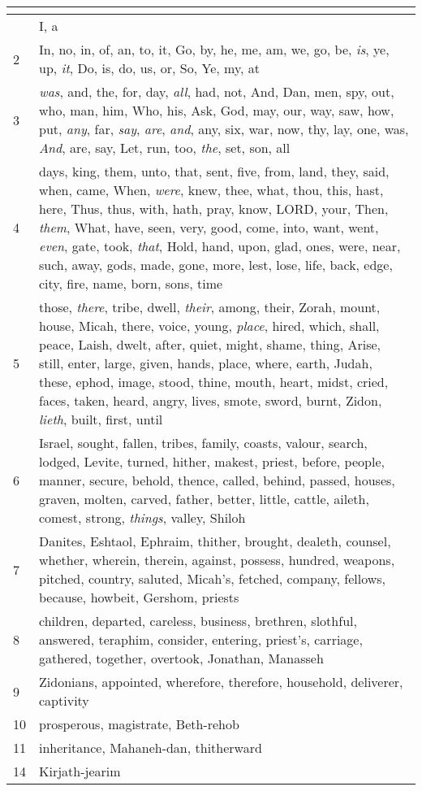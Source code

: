 \begin{center}
\begin{longtable}{l|p{3.75in}}
\hline \multicolumn{2}{c}{{ }} \\ \hline
\endfoot 
1 & I, a\\ \hline 
2 & In, no, in, of, an, to, it, Go, by, he, me, am, we, go, be, \emph{is}, ye, up, \emph{it}, Do, is, do, us, or, So, Ye, my, at\\ \hline 
3 & \emph{was}, and, the, for, day, \emph{all}, had, not, And, Dan, men, spy, out, who, man, him, Who, his, Ask, God, may, our, way, saw, how, put, \emph{any}, far, \emph{say}, \emph{are}, \emph{and}, any, six, war, now, thy, lay, one, was, \emph{And}, are, say, Let, run, too, \emph{the}, set, son, all\\ \hline 
4 & days, king, them, unto, that, sent, five, from, land, they, said, when, came, When, \emph{were}, knew, thee, what, thou, this, hast, here, Thus, thus, with, hath, pray, know, LORD, your, Then, \emph{them}, What, have, seen, very, good, come, into, want, went, \emph{even}, gate, took, \emph{that}, Hold, hand, upon, glad, ones, were, near, such, away, gods, made, gone, more, lest, lose, life, back, edge, city, fire, name, born, sons, time\\ \hline 
5 & those, \emph{there}, tribe, dwell, \emph{their}, among, their, Zorah, mount, house, Micah, there, voice, young, \emph{place}, hired, which, shall, peace, Laish, dwelt, after, quiet, might, shame, thing, Arise, still, enter, large, given, hands, place, where, earth, Judah, these, ephod, image, stood, thine, mouth, heart, midst, cried, faces, taken, heard, angry, lives, smote, sword, burnt, Zidon, \emph{lieth}, built, first, until\\ \hline 
6 & Israel, sought, fallen, tribes, family, coasts, valour, search, lodged, Levite, turned, hither, makest, priest, before, people, manner, secure, behold, thence, called, behind, passed, houses, graven, molten, carved, father, better, little, cattle, aileth, comest, strong, \emph{things}, valley, Shiloh\\ \hline 
7 & Danites, Eshtaol, Ephraim, thither, brought, dealeth, counsel, whether, wherein, therein, against, possess, hundred, weapons, pitched, country, saluted, Micah's, fetched, company, fellows, because, howbeit, Gershom, priests\\ \hline 
8 & children, departed, careless, business, brethren, slothful, answered, teraphim, consider, entering, priest's, carriage, gathered, together, overtook, Jonathan, Manasseh\\ \hline 
9 & Zidonians, appointed, wherefore, therefore, household, deliverer, captivity\\ \hline 
10 & prosperous, magistrate, Beth-rehob\\ \hline 
11 & inheritance, Mahaneh-dan, thitherward\\ \hline 
14 & Kirjath-jearim\\ \hline 
\end{longtable}
\end{center}





